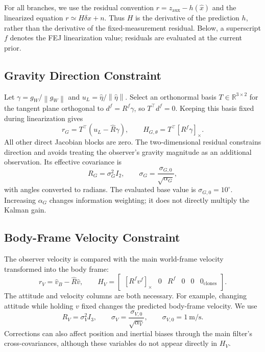 \documentclass[a4paper,runningheads,twocolumn]{llncs}
\newcommand{\R}{\mathbb{R}}
\newcommand{\sk}[1]{[#1]_{\times}}
\newcommand{\norm}[1]{\left\lVert #1\right\rVert}
\begin{document}
For all branches, we use the residual convention $r=z_{\mathrm{aux}}-h(\hat x)$ and the linearized equation $r\simeq H\delta x+n$. Thus $H$ is the derivative of the prediction $h$, rather than the derivative of the fixed-measurement residual. Below, a superscript $f$ denotes the FEJ linearization value; residuals are evaluated at the current prior.

\subsection{Gravity Direction Constraint}
Let $\gamma=g_W/\norm{g_W}$ and $u_L=\hat\eta/\norm{\hat\eta}$. Select an orthonormal basis $T\in\R^{3\times2}$ for the tangent plane orthogonal to $d^f=R^f\gamma$, so $T^\top d^f=0$. Keeping this basis fixed during linearization gives
\begin{equation}
 r_G=T^\top(u_L-\hat R\gamma),\qquad
 H_{G,\theta}=T^\top\sk{R^f\gamma}.
 \label{eq:gravity}
\end{equation}
All other direct Jacobian blocks are zero. The two-dimensional residual constrains direction and avoids treating the observer's gravity magnitude as an additional observation. Its effective covariance is
\begin{equation}
 R_G=\sigma_G^2I_2,\qquad
 \sigma_G=\frac{\sigma_{G,0}}{\sqrt{\alpha_G}},
 \label{eq:gnoise}
\end{equation}
with angles converted to radians. The evaluated base value is $\sigma_{G,0}=10^\circ$. Increasing $\alpha_G$ changes information weighting; it does not directly multiply the Kalman gain.

\subsection{Body-Frame Velocity Constraint}
The observer velocity is compared with the main world-frame velocity transformed into the body frame:
\begin{equation}
 r_V=\hat v_B-\hat R\hat v,\qquad
 H_V=\begin{bmatrix}
 \sk{R^fv^f}&0&R^f&0&0&0_{\mathrm{clones}}
 \end{bmatrix}.
 \label{eq:velocity}
\end{equation}
The attitude and velocity columns are both necessary. For example, changing attitude while holding $v$ fixed changes the predicted body-frame velocity. We use
\begin{equation}
 R_V=\sigma_V^2I_3,\qquad
 \sigma_V=\frac{\sigma_{V,0}}{\sqrt{\alpha_V}},\qquad
 \sigma_{V,0}=1~\mathrm{m/s}.
 \label{eq:vnoise}
\end{equation}
Corrections can also affect position and inertial biases through the main filter's cross-covariances, although these variables do not appear directly in $H_V$.
\end{document}
